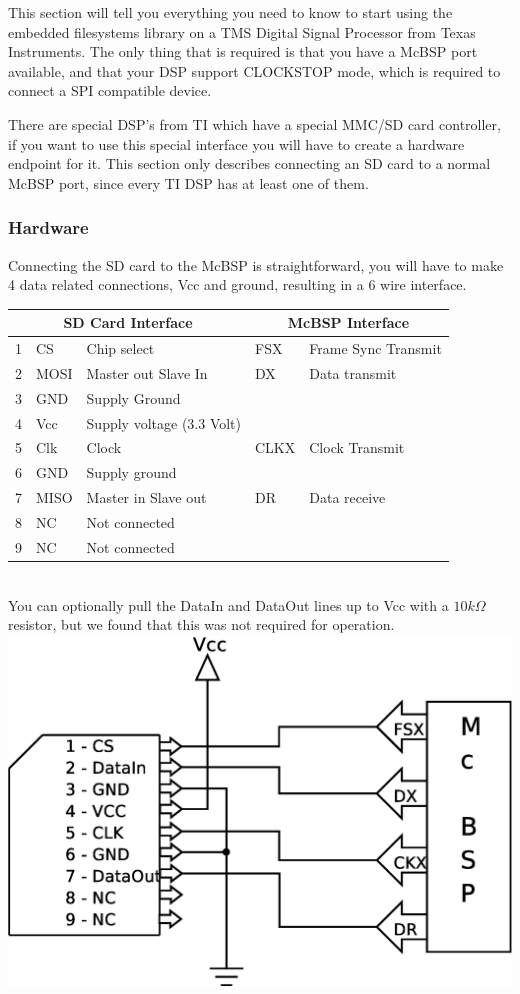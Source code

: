 This section will tell you everything you need to know to start using the
embedded filesystems library on a TMS Digital Signal Processor from Texas Instruments.
The only thing that is required is that you have a McBSP port available, and that your DSP
support CLOCKSTOP mode, which is required to connect a SPI compatible device.

There are special DSP's from TI which have a special MMC/SD card controller, if you want to
use this special interface you will have to create a hardware endpoint for it. This section only
describes connecting an SD card to a normal McBSP port, since every TI DSP has at least one of them.

\subsubsection{Hardware}
Connecting the SD card to the McBSP is straightforward, you will have to make 4 data related
connections, Vcc and ground, resulting in a 6 wire interface.\\
\begin{tabular}{|l|l|l|l|l|}
	\hline
	\multicolumn{3}{|c|}{SD Card Interface}&\multicolumn{2}{|c|}{McBSP Interface}\\
	\hline
	1 & CS & Chip select & FSX & Frame Sync Transmit \\
	2 & MOSI & Master out Slave In & DX & Data transmit \\
	3 & GND & Supply Ground &&\\
	4 & Vcc & Supply voltage (3.3 Volt) &&\\
	5 & Clk & Clock & CLKX & Clock Transmit\\
	6 & GND & Supply ground &&\\
	7 & MISO & Master in Slave out & DR & Data receive \\
	8 & NC & Not connected &&\\
	9 & NC & Not connected &&\\
	\hline
\end{tabular}\\
You can optionally pull the DataIn and DataOut lines up to Vcc with a $10k\Omega$ resistor, but
we found that this was not required for operation.\\
\includegraphics[scale=0.4]{schematics/sdcard.eps}\\
